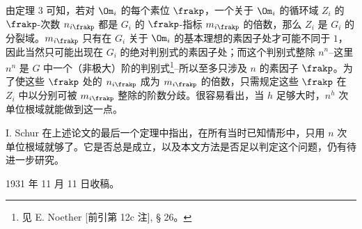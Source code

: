 由定理 3 可知，若对 \(\Om_i\) 的每个素位 \(\frakp\)，一个关于 \(\Om_i\) 的循环域 \(Z_i\) 的 \(\frakp\)-次数 \(n_{i\frakp}\) 都是 \(G_i\) 的 \(\frakp\)-指标 \(m_{i\frakp}\) 的倍数，那么 \(Z_i\) 是 \(G_i\) 的分裂域。\(m_{i\frakp}\) 只有在 \(G_i\) 关于 \(\Om_i\) 的基本理想的素因子处才可能不同于 \(1\)，因此当然只可能出现在 \(G_i\) 的绝对判别式的素因子处；而这个判别式整除 \(n^n\)--这里 \(n^n\) 是 \(G\) 中一个（非极大）阶的判别式\footnote{见 E. Noether [前引第 12c 注], § 26。}--所以至多只涉及 \(n\) 的素因子 \(\frakp\)。为了使这些 \(\frakp\) 处的 \(n_{i\frakp}\) 成为 \(m_{i\frakp}\) 的倍数，只需规定这些 \(\frakp\) 在 \(Z_i\) 中以分别可被 \(m_{i\frakp}\) 整除的阶数分歧。很容易看出，当 \(h\) 足够大时，\(n^h\) 次单位根域就能做到这一点。

I. Schur 在上述论文的最后一个定理中指出，在所有当时已知情形中，只用 \(n\) 次单位根域就够了。它是否总是成立，以及本文方法是否足以判定这个问题，仍有待进一步研究。

\begin{center}
1931 年 11 月 11 日收稿。
\end{center}

\clearpage
\setcounter{footnote}{0}

